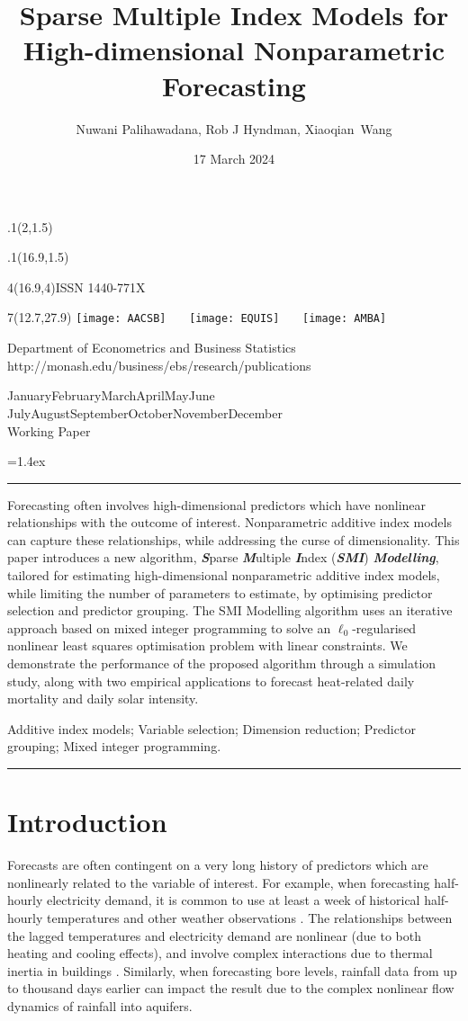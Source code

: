\documentclass[
  11pt,
  a4paper,
]{article}
\title{Sparse Multiple Index Models for High-dimensional Nonparametric
Forecasting}
\date{17 March 2024}
\author{Nuwani Palihawadana, Rob J Hyndman, Xiaoqian~Wang}
\makeatletter
\def\placefig#1#2#3#4{\begin{textblock}{.1}(#1,#2)\rlap{\texttt{[image: \#4]}}\end{textblock}}
\def\Date{\number\day}
\def\Month{\ifcase\month\or
 January\or February\or March\or April\or May\or June\or
 July\or August\or September\or October\or November\or December\fi}
\def\Year{\number\year}
\def\showjel{{\large\textsf{\textbf{JEL classification:}}~\@jel}}
\def\cover{{\sffamily\setcounter{page}{0}
        \thispagestyle{empty}
        \placefig{2}{1.5}{width=5cm}{monash2}
        \placefig{16.9}{1.5}{width=2.1cm}{MBSportrait}
        \begin{textblock}{4}(16.9,4)ISSN 1440-771X\end{textblock}
        \begin{textblock}{7}(12.7,27.9)\hfill
        \texttt{[image: AACSB]}~~~
        \texttt{[image: EQUIS]}~~~
        \texttt{[image: AMBA]}
        \end{textblock}
        \vspace*{2.5cm}
        \begin{center}\Large
        Department of Econometrics and Business Statistics\\[.5cm]
        \footnotesize http://monash.edu/business/ebs/research/publications
        \end{center}\vspace{2cm}
        \begin{center}
        \fbox{\parbox{14cm}{\begin{onehalfspace}\centering\Huge\vspace*{0.3cm}
                \textsf{\textbf{\expandafter{\@title}}}\vspace{1cm}\par
                \LARGE
                \expandafter{\@author}
                \end{onehalfspace}
        }}
        \end{center}
        \vfill
                \begin{center}\Large
                \Month~\Year\\[1cm]
                Working Paper \@wp
        \end{center}\vspace*{2cm}}}
\def\pageone{{\sffamily\setstretch{1}%
        \thispagestyle{empty}%
        \vbox to \textheight{%
        \raggedright\baselineskip=1.2cm
     {\fontsize{24.88}{30}\sffamily\textbf{\expandafter{\@title}}}
        \vspace{2cm}\par
        \hspace{1cm}\parbox{14cm}{\sffamily\large\@addresses}\vspace{1cm}\vfill
        \hspace{1cm}{\large\Date~\Month~\Year}\\[1cm]
        \hspace{1cm}\showjel\vss}}}
\def\blindtitle{{\sffamily
     \thispagestyle{plain}\raggedright\baselineskip=1.2cm
     {\fontsize{24.88}{30}\sffamily\textbf{\expandafter{\@title}}}\vspace{1cm}\par
        }}
\def\titlepage{{\cover\newpage\pageone\newpage\blindtitle}}
\let\maketitle\titlepage
\newenvironment{keywords}{\par\vspace{0.5cm}\noindent{\sffamily\textbf{Keywords:}}}{\vspace{0.25cm}\par\hrule\vspace{0.5cm}\par}
\renewenvironment{abstract}{\begin{minipage}{\textwidth}\parskip=1.4ex\noindent
\hrule\vspace{0.1cm}\par{\sffamily\textbf{\abstractname}}\newline\setstretch{1.5}}
  {\end{minipage}}
\makeatother
\begin{document}
\maketitle

\begin{abstract}
Forecasting often involves high-dimensional predictors which have
nonlinear relationships with the outcome of interest. Nonparametric
additive index models can capture these relationships, while addressing
the curse of dimensionality. This paper introduces a new algorithm,
\textbf{\emph{S}}parse \textbf{\emph{M}}ultiple \textbf{\emph{I}}ndex
(\textbf{\emph{SMI}}) \textbf{\emph{Modelling}}, tailored for estimating
high-dimensional nonparametric additive index models, while limiting the
number of parameters to estimate, by optimising predictor selection and
predictor grouping. The SMI Modelling algorithm uses an iterative
approach based on mixed integer programming to solve an
\(\ell_{0}\)-regularised nonlinear least squares optimisation problem
with linear constraints. We demonstrate the performance of the proposed
algorithm through a simulation study, along with two empirical
applications to forecast heat-related daily mortality and daily solar
intensity.
\end{abstract}

\begin{keywords}
  Additive index models; Variable selection; Dimension
reduction; Predictor grouping; 
  Mixed integer programming.
\end{keywords}

\section{Introduction}\label{sec-introduction}

Forecasts are often contingent on a very long history of predictors
which are nonlinearly related to the variable of interest. For example,
when forecasting half-hourly electricity demand, it is common to use at
least a week of historical half-hourly temperatures and other weather
observations \autocite{HF2010}. The relationships between the lagged
temperatures and electricity demand are nonlinear (due to both heating
and cooling effects), and involve complex interactions due to thermal
inertia in buildings \autocite{FH2012}. Similarly, when forecasting bore
levels, rainfall data from up to thousand days earlier can impact the
result \autocite{Peterson2014,Bakker2019,Rajaee2019} due to the complex
nonlinear flow dynamics of rainfall into aquifers.
\end{document}
